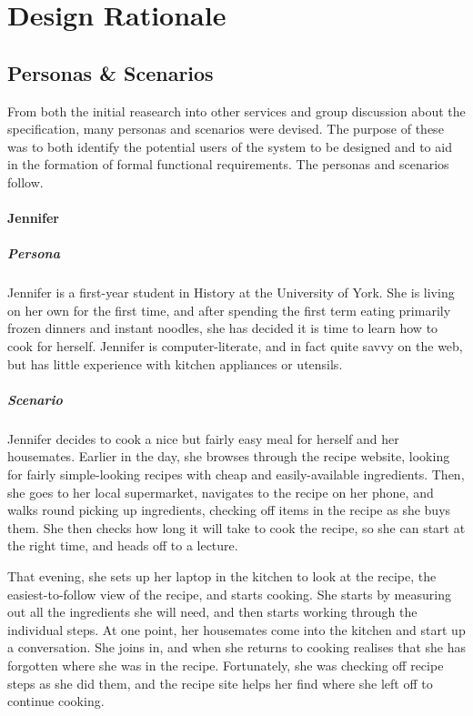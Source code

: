 \section{Design Rationale}

\subsection{Personas \& Scenarios}
From both the initial reasearch into other services and group discussion about the specification, many personas and scenarios were devised. The purpose of these was to both identify the potential users of the system to be designed and to aid in the formation of formal functional requirements. The personas and scenarios follow.

\paragraph{Jennifer}
\subparagraph{Persona}
Jennifer is a first-year student in History at the University of York. She is 
living on her own for the first time, and after spending the first term eating
primarily frozen dinners and instant noodles, she has decided it is time to 
learn how to cook for herself. Jennifer is computer-literate, and in fact quite
savvy on the web, but has little experience with kitchen appliances or utensils.
\subparagraph{Scenario}
Jennifer decides to cook a nice but fairly easy meal for herself and her 
housemates. Earlier in the day, she browses through the recipe website, looking
for fairly simple-looking recipes with cheap and easily-available ingredients.
Then, she goes to her local supermarket, navigates to the recipe on her phone,
and walks round picking up ingredients, checking off items in the recipe as she
buys them. She then checks how long it will take to cook the recipe, so she can
start at the right time, and heads off to a lecture.

That evening, she sets up her laptop in the kitchen to look at the recipe,
the easiest-to-follow view of the recipe, and starts cooking. She starts by 
measuring out all the ingredients she will need, and then starts working through
the individual steps. At one point, her housemates come into the kitchen and 
start up a conversation. She joins in, and when she returns to cooking realises
that she has forgotten where she was in the recipe. Fortunately, she was
checking off recipe steps as she did them, and the recipe site helps her find
where she left off to continue cooking.

